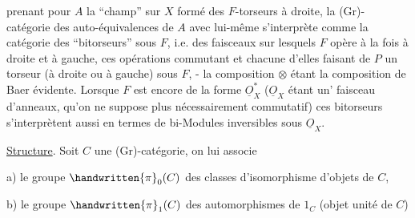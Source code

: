 
prenant pour $A$ la ``champ'' sur $X$ formé des $F$-torseurs à droite, la (Gr)- catégorie des auto-équivalences de $A$ avec lui-même s'interprète comme la catégorie des ``bitorseurs'' sous $F$, i.e. des faisceaux  sur lesquels $F$ opère à la fois à droite et à gauche, ces opérations commutant et chacune d'elles faisant de $P$ un torseur (à droite ou à gauche) sous $F$, - la composition $\otimes$ étant la composition de Baer évidente. Lorsque $F$ est encore de la forme $\underline{O}_{X}^{*}$ ($\underline{O}_{X}$ étant un' faisceau d'anneaux, qu'on ne suppose plus nécessairement commutatif) ces bitorseurs s'interprètent aussi en termes de bi-Modules inversibles sous $\underline{O}_{X}$.

\uline{Structure}.  Soit $C$ une (Gr)-catégorie, on lui associe

a) le groupe $\handwritten{\pi}_{0}(C)$ des classes d'isomorphisme d'objets de $C$,

b) le groupe $\handwritten{\pi}_{1}(C)$ des automorphismes de $1_C$ (objet unité de $C$)

